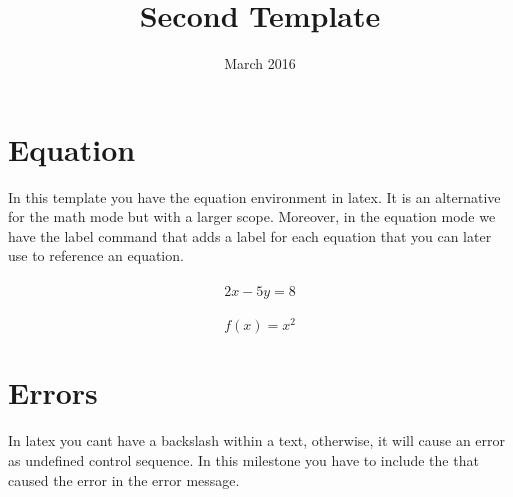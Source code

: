 \documentclass{article}
\begin{document}
\title{Second Template}
\date{March 2016}
\maketitle


\section{Equation}
In this template you have the equation environment in latex. It is an alternative for the math mode but with a larger scope. Moreover, in the equation mode we have the label command that adds a label for each equation that you can later use to reference an equation. \\
\\
\begin{equation}
\label{eq1}
2x-5y=8
\end{equation}
\\
\begin{equation}
\label{eq2}
f(x)=x^2
\end{equation}



\section{Errors}
In latex you cant have a backslash within a text, otherwise, it will cause an error as undefined control sequence. In this milestone you have to include the  that caused the error in the error message. \errorcoming
\end{document}
